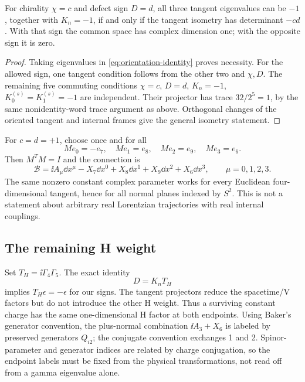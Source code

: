 \begin{proposition}\label{prop:all-charge}
For chirality $\chi=c$ and defect sign $D=d$, all three tangent
eigenvalues can be $-1$, together with $K_n=-1$, if and only if the
tangent isometry has determinant $-cd$. With that sign the common
space has complex dimension one; with the opposite sign it is zero.
\end{proposition}
\begin{proof}
Taking eigenvalues in \eqref{eq:orientation-identity} proves necessity.
For the allowed sign, one tangent condition follows from the other
two and $\chi,D$. The remaining five commuting conditions
$\chi=c$, $D=d$, $K_n=-1$, $K_0^{(s)}=K_1^{(s)}=-1$ are independent.
Their projector has trace $32/2^5=1$, by the same nonidentity-word
trace argument as above. Orthogonal changes of the oriented tangent
and internal frames give the general isometry statement.
\end{proof}

For $c=d=+1$, choose once and for all
\begin{equation}\label{eq:M-map}
 Me_0=-e_7,\quad Me_1=e_8,\quad Me_2=e_9,\quad Me_3=e_6.
\end{equation}
Then $M^TM=I$ and the connection is
\begin{equation}\label{eq:all-connection}
 \mathcal B=\ii A_\mu\dd x^\mu-X_7\dd x^0
              +X_8\dd x^1+X_9\dd x^2+X_6\dd x^3,
 \qquad\mu=0,1,2,3.
\end{equation}
The same nonzero constant complex parameter works for every Euclidean
four-dimensional tangent, hence for all normal planes indexed by
$S^2$. This is not a statement about arbitrary real Lorentzian
trajectories with real internal couplings.

\subsection{The remaining H weight}

Set $T_H=\ii\Gamma_4\Gamma_5$. The exact identity
\begin{equation}\label{eq:H-weight}
 D=K_nT_H
\end{equation}
implies $T_H\epsilon=-\epsilon$ for our signs. The tangent projectors
reduce the spacetime/V factors but do not introduce the other H weight.
Thus a surviving constant charge has the same one-dimensional H factor
at both endpoints. Using Baker's generator convention, the plus-normal
combination $\ii A_3+X_6$ is labeled by preserved generators $Q_{i2}$;
the conjugate convention exchanges 1 and 2. Spinor-parameter and
generator indices are related by charge conjugation, so the endpoint
labels must be fixed from the physical transformations, not read off
from a gamma eigenvalue alone.

